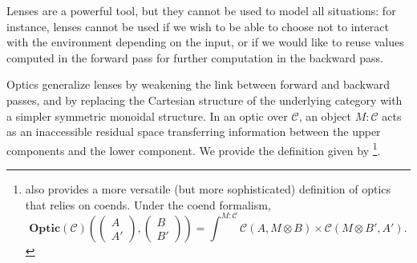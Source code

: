 \documentclass[11pt,a4paper,openright,twoside]{report}
\theoremstyle{plain}
\theoremstyle{definition}
\begin{document}
Lenses are a powerful tool, but they cannot be used to model all situations: for instance, lenses cannot be used if we wish to be able to choose not to interact with the environment depending on the input, or if we would like to reuse values computed in the forward pass for further computation in the backward pass.


Optics generalize lenses by weakening the link between forward and backward passes, and by replacing the Cartesian structure of the underlying category with a simpler symmetric monoidal structure. In an optic over $\mathcal{C}$, an object $M : \mathcal{C}$ acts as an inaccessible residual space transferring information between the upper components and the lower component.
We provide the definition given by \cite{riley2018categories}\footnote{\cite{riley2018categories}also provides a more versatile (but more sophisticated) definition of optics that relies on coends. Under the coend formalism,
\[\mathbf{Optic}(\mathcal{C})\left(\left(\begin{smallmatrix} A \\ A' \end{smallmatrix}\right),\left(\begin{smallmatrix} B \\ B' \end{smallmatrix}\right)\right) = \int^{M : \mathcal{C}}\mathcal{C}(A,M \otimes B) \times \mathcal{C}(M \otimes B',A').\]}.
\end{document}
